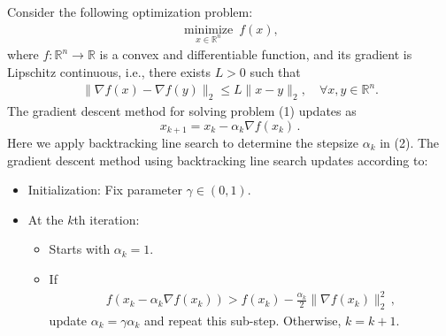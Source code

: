 \documentclass[11pt, a4paper]{article}
\begin{document}
Consider the following optimization problem:
\begin{align}
\underset{x\in \mathbb{R}^n}{\operatorname{minimize}}~f(x),\label{prob}
\end{align}
where $f:\mathbb{R}^n\rightarrow \mathbb{R}$ is a convex and differentiable function, and its gradient is Lipschitz continuous, i.e., there exists $L>0$ such that
\begin{align*}
\|\nabla f(x)-\nabla f(y)\|_2\le L\|x-y\|_2, \quad \forall x,y\in \mathbb{R}^n.
\end{align*}
The gradient descent method for solving problem (1) updates as
\begin{equation}
x_{k+1} = x_k - \alpha_k\nabla f(x_k)\,.\label{eq:graddescent}
\end{equation}
Here we apply backtracking line search to determine the stepsize $\alpha_k$ in (2). The gradient descent method using backtracking line search updates according to: 

\begin{itemize}
	\item Initialization: Fix parameter $\gamma\in(0,1)$.
	\item At the $k$th iteration:
	\begin{itemize}
		\item Starts with $\alpha_k=1$.
		\item If 
		\begin{align*}
		f(x_k-\alpha_k\nabla f(x_k)) > f(x_k) - \frac{\alpha_k}{2}\|\nabla f(x_k)\|_2^2\,,
		\end{align*}
		update $\alpha_k = \gamma\alpha_k$ and repeat this sub-step. Otherwise, $k=k+1$.
	\end{itemize}
\end{itemize}
\end{document}
